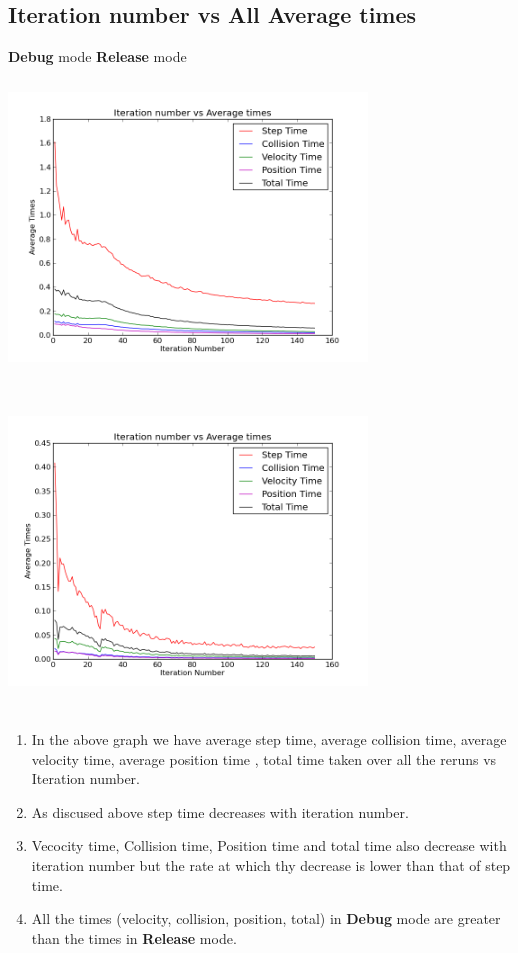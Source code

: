 \documentclass{article}
\begin{document}
\subsection{Iteration number vs All Average times}
\textbf{Debug} mode \hfill \textbf{Release} mode\\
\includegraphics[width=270pt,height=240pt]{g27_lab09_plot02_debug} \hfill  
\includegraphics[width=270pt,height=240pt]{g27_lab09_plot02_release}\\
\begin{enumerate}
\item In the above graph we have average step time, average collision time, average velocity time, average position time
, total time taken over all the reruns vs Iteration number.\\
\item As discused above step time decreases with iteration number.
\item Vecocity time, Collision time, Position time and total time also decrease with iteration number but the rate at which thy decrease is lower than 
that of step time.
\item All the times (velocity, collision, position, total) in \textbf{Debug} mode are greater than the times
 in \textbf{Release} mode.
\end{enumerate}
\end{document}
